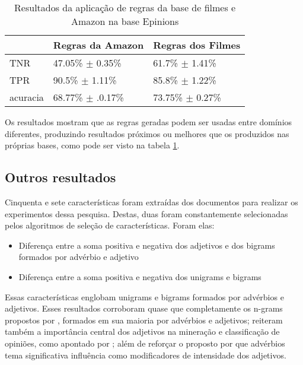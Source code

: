 \documentclass[template.tex]{subfiles}
\begin{document}
\begin{table}[!h]
    \begin{tabular}{lll}
    ~               & Regras da Amazon                  & Regras dos Filmes \\ \hline
    TNR             & 47.05\% $\pm$ 0.35\%           & 61.7\% $\pm$ 1.41\%    \\
    TPR         & 90.5\% $\pm$ 1.11\%               & 85.8\% $\pm$ 1.22\%   \\
    acuracia    & 68.77\% $\pm$ .0.17\%             & 73.75\% $\pm$ 0.27\%    \\
    \end{tabular}
    \caption{Resultados da aplicação de regras da base de filmes e Amazon na base Epinions}
    \label{table:epinions}
\end{table}

Os resultados mostram que as regras geradas podem ser usadas entre domínios diferentes, produzindo resultados próximos ou melhores que os produzidos nas próprias bases, como pode ser visto na tabela \ref{table:epinions}.

\subsection{Outros resultados}

Cinquenta e sete características foram extraídas dos documentos para realizar os experimentos dessa pesquisa. Destas, duas foram constantemente selecionadas pelos algoritmos de seleção de características. Foram elas:
\begin{itemize}
\item Diferença entre a soma positiva e negativa dos adjetivos e dos bigrams formados por advérbio e adjetivo
\item Diferença entre a soma positiva e negativa dos unigrams e bigrams
\end{itemize}

Essas características englobam unigrams e bigrams formados por advérbios e adjetivos. Esses resultados corroboram quase que completamente os n-grams propostos por \cite{turney2002thumbs}, formados em sua maioria por advérbios e adjetivos; reiteram também a importância central dos adjetivos na mineração e classificação de opiniões, como apontado por \cite{voll2007not}; além de reforçar o proposto por \cite{benamara2007sentiment} que advérbios tema significativa influência como modificadores de intensidade dos adjetivos.
\end{document}
